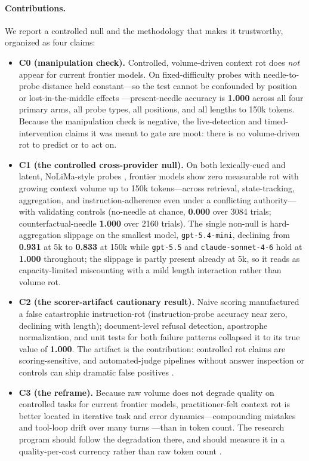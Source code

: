 \documentclass[11pt]{article}
\begin{document}
\paragraph{Contributions.} We report a controlled null and the methodology that makes it trustworthy, organized as four claims:
\begin{itemize}
  \item \textbf{C0 (manipulation check).} Controlled, volume-driven context rot does \emph{not} appear for current frontier models. On fixed-difficulty probes with needle-to-probe distance held constant---so the test cannot be confounded by position or lost-in-the-middle effects \cite{liu2024lostmiddle}---present-needle accuracy is \textbf{1.000} across all four primary arms, all probe types, all positions, and all lengths to 150k tokens. Because the manipulation check is negative, the live-detection and timed-intervention claims it was meant to gate are moot: there is no volume-driven rot to predict or to act on.
  \item \textbf{C1 (the controlled cross-provider null).} On both lexically-cued and latent, NoLiMa-style probes \cite{modarressi2025nolima}, frontier models show zero measurable rot with growing context volume up to 150k tokens---across retrieval, state-tracking, aggregation, and instruction-adherence even under a conflicting authority---with validating controls (no-needle at chance, \textbf{0.000} over 3084 trials; counterfactual-needle \textbf{1.000} over 2160 trials). The single non-null is hard-aggregation slippage on the smallest model, \texttt{gpt-5.4-mini}, declining from \textbf{0.931} at 5k to \textbf{0.833} at 150k while \texttt{gpt-5.5} and \texttt{claude-sonnet-4-6} hold at \textbf{1.000} throughout; the slippage is partly present already at 5k, so it reads as capacity-limited miscounting with a mild length interaction rather than volume rot.
  \item \textbf{C2 (the scorer-artifact cautionary result).} Naive scoring manufactured a false catastrophic instruction-rot (instruction-probe accuracy near zero, declining with length); document-level refusal detection, apostrophe normalization, and unit tests for both failure patterns collapsed it to its true value of \textbf{1.000}. The artifact is the contribution: controlled rot claims are scoring-sensitive, and automated-judge pipelines without answer inspection or controls can ship dramatic false positives \cite{zheng2023judge}.
  \item \textbf{C3 (the reframe).} Because raw volume does not degrade quality on controlled tasks for current frontier models, practitioner-felt context rot is better located in iterative task and error dynamics---compounding mistakes and tool-loop drift over many turns \cite{orlanski2026slopcodebench, deng2026evoclaw}---than in token count. The research program should follow the degradation there, and should measure it in a quality-per-cost currency rather than raw token count \cite{erol2025costofpass, kwa2025metr}.
\end{itemize}
\end{document}
